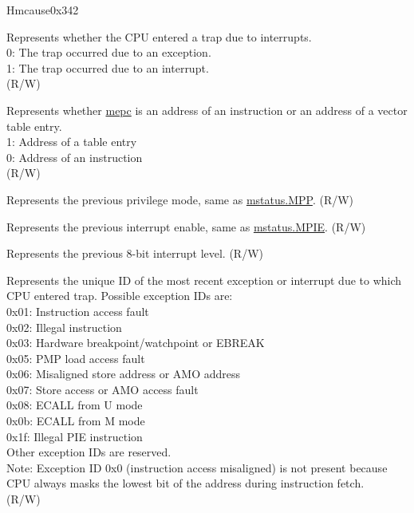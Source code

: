 \begin{register}{H}{mcause}{0x342}\label{regdesc:MCAUSE}
%
%
%
%
%
%
%
%
\regnewline%
\begin{regdesc}\begin{reglist}
\label{fielddesc:MCAUSEINT}\item [INT] Represents whether the CPU entered a trap due to interrupts. \\
0: The trap occurred due to an exception.\\
1: The trap occurred due to an interrupt.\\
(R/W) 
\label{fielddesc:MCAUSE_MINHV}\item [MINHV] Represents whether \hyperref[fielddesc:MEPC]{mepc} is an address of an instruction or an address of a vector table entry.\\
1: Address of a table entry\\
0: Address of an instruction\\
(R/W)
\label{fielddesc:MCAUSE_MPP}\item [MPP] Represents the previous privilege mode, same as \hyperref[fielddesc:MSTATUSMPP]{mstatus.MPP}. (R/W)
\label{fielddesc:MCAUSE_MPIE}\item [MPIE] Represents the previous interrupt enable, same as \hyperref[fielddesc:MSTATUSMPIE]{mstatus.MPIE}. (R/W)
\label{fielddesc:MCAUSE_MPIL}\item [MPIL] Represents the previous 8-bit interrupt level. (R/W)
\label{fielddesc:MCAUSECODE}\item [CODE] Represents the unique ID of the most recent exception or interrupt due to which CPU entered trap. Possible exception IDs are:\\
0x01: Instruction access fault\\
0x02: Illegal instruction\\
0x03: Hardware breakpoint/watchpoint or EBREAK\\
0x05: PMP load access fault\\
0x06: Misaligned store address or AMO address\\
0x07: Store access or AMO access fault\\
0x08: ECALL from U mode\\
0x0b: ECALL from M mode\\
0x1f: Illegal PIE instruction\\
Other exception IDs are reserved.\\
Note: Exception ID 0x0 (instruction access misaligned) is not present because CPU always masks the lowest bit of the address during instruction fetch.\\
(R/W)
\end{reglist}\end{regdesc}
\end{register}

